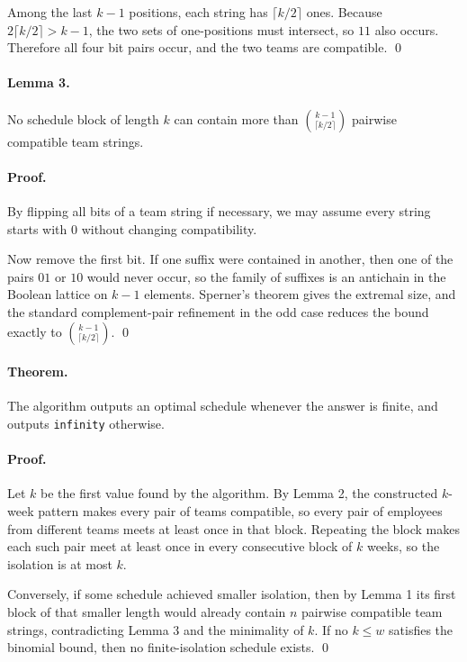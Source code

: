\documentclass[11pt]{article}
\begin{document}
Among the last $k-1$ positions, each string has $\lceil k/2\rceil$ ones. Because
$2\lceil k/2\rceil > k-1$, the two sets of one-positions must intersect, so $11$ also occurs. Therefore all
four bit pairs occur, and the two teams are compatible. \qed

\paragraph{Lemma 3.}
No schedule block of length $k$ can contain more than $\binom{k-1}{\lceil k/2\rceil}$ pairwise compatible
team strings.

\paragraph{Proof.}
By flipping all bits of a team string if necessary, we may assume every string starts with $0$ without
changing compatibility.

Now remove the first bit. If one suffix were contained in another, then one of the pairs $01$ or $10$
would never occur, so the family of suffixes is an antichain in the Boolean lattice on $k-1$ elements.
Sperner's theorem gives the extremal size, and the standard complement-pair refinement in the odd case
reduces the bound exactly to $\binom{k-1}{\lceil k/2\rceil}$. \qed

\paragraph{Theorem.}
The algorithm outputs an optimal schedule whenever the answer is finite, and outputs
\texttt{infinity} otherwise.

\paragraph{Proof.}
Let $k$ be the first value found by the algorithm. By Lemma 2, the constructed $k$-week pattern makes
every pair of teams compatible, so every pair of employees from different teams meets at least once in
that block. Repeating the block makes each such pair meet at least once in every consecutive block of
$k$ weeks, so the isolation is at most $k$.

Conversely, if some schedule achieved smaller isolation, then by Lemma 1 its first block of that smaller
length would already contain $n$ pairwise compatible team strings, contradicting Lemma 3 and the
minimality of $k$. If no $k \le w$ satisfies the binomial bound, then no finite-isolation schedule exists.
\qed
\end{document}
